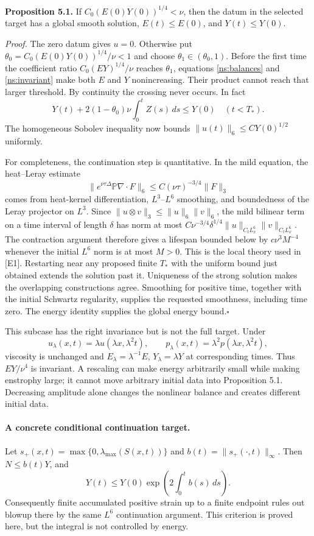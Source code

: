 \documentclass[11pt]{article}
\begin{document}
\textbf{Proposition 5.1.}
If $C_0(E(0)Y(0))^{1/4}<\nu$, then the datum in the selected target has a
 global smooth solution, $E(t)\leq E(0)$, and $Y(t)\leq Y(0)$.

\emph{Proof.}
The zero datum gives $u=0$. Otherwise put
 $\theta_0=C_0(E(0)Y(0))^{1/4}/\nu<1$ and choose
 $\theta_1\in(\theta_0,1)$. Before the first time the coefficient ratio
 $C_0(EY)^{1/4}/\nu$ reaches $\theta_1$, equations
 \eqref{ns:balances} and \eqref{ns:invariant} make both $E$ and $Y$
 nonincreasing. Their product cannot reach that larger threshold.
 By continuity the crossing never occurs. In fact
\[
 Y(t)+2(1-\theta_0)\nu\int_0^t Z(s)\,ds\leq Y(0)
 \quad(t<T_*).
\]
The homogeneous Sobolev inequality now bounds
 $\|u(t)\|_6\leq C Y(0)^{1/2}$ uniformly.

For completeness, the continuation step is quantitative. In the mild
 equation, the heat--Leray estimate
\[
 \|e^{\nu\tau\Delta}\mathbb P\nabla\cdot F\|_6
 \leq C(\nu\tau)^{-3/4}\|F\|_3
\]
comes from heat-kernel differentiation, $L^3$--$L^6$ smoothing, and
 boundedness of the Leray projector on $L^3$. Since
 $\|u\otimes v\|_3\leq\|u\|_6\|v\|_6$, the mild bilinear term on a
 time interval of length $\delta$ has norm at most
 $C\nu^{-3/4}\delta^{1/4}\|u\|_{C_tL^6_x}\|v\|_{C_tL^6_x}$.
 The contraction argument therefore gives a lifespan bounded below by
 $c\nu^3M^{-4}$ whenever the initial $L^6$ norm is at most $M>0$.
 This is the local theory used in [E1]. Restarting near any proposed finite
 $T_*$ with the uniform bound just obtained extends the solution past it.
 Uniqueness of the strong solution makes the overlapping constructions agree.
 Smoothing for positive time, together with the initial Schwartz regularity,
 supplies the requested smoothness, including time zero. The energy identity
 supplies the global energy bound.\hfill$\square$

This subcase has the right invariance but is not the full target. Under
\[
 u_\lambda(x,t)=\lambda u(\lambda x,\lambda^2t),\qquad
 p_\lambda(x,t)=\lambda^2p(\lambda x,\lambda^2t),
\]
viscosity is unchanged and
 $E_\lambda=\lambda^{-1}E$, $Y_\lambda=\lambda Y$ at corresponding times.
 Thus $EY/\nu^4$ is invariant. A rescaling can make energy arbitrarily
 small while making enstrophy large; it cannot move arbitrary initial data
 into Proposition 5.1. Decreasing amplitude alone changes the nonlinear
 balance and creates different initial data.

\paragraph{A concrete conditional continuation target.}
Let $s_+(x,t)=\max\{0,\lambda_{\max}(S(x,t))\}$ and
 $b(t)=\|s_+(\cdot,t)\|_\infty$. Then $N\leq b(t)Y$, and
\[
 Y(t)\leq Y(0)\exp\left(2\int_0^t b(s)\,ds\right).
\]
Consequently finite accumulated positive strain up to a finite endpoint
 rules out blowup there by the same $L^6$ continuation argument.
 This criterion is proved here, but the integral is not controlled by energy.
\end{document}
